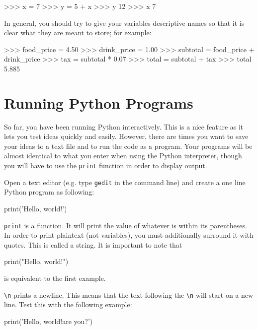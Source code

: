 \documentclass[11pt]{cselabheader}
\begin{document}
\begin{python3code}
>>> x = 7
>>> y = 5 + x
>>> y
12
>>> x
7
\end{python3code}

In general, you should try to give your variables descriptive names so that it is
clear what they are meant to store; for example:

\begin{python3code}
>>> food_price = 4.50
>>> drink_price = 1.00
>>> subtotal = food_price + drink_price
>>> tax = subtotal * 0.07
>>> total = subtotal + tax
>>> total
5.885
\end{python3code}

\pagebreak
\section{Running Python Programs}

So far, you have been running Python interactively. This is a nice feature as it
lets you test ideas quickly and easily. However, there are times you want to
save your ideas to a text file and to run the code as a program. Your programs
will be almost identical to what you enter when using the Python interpreter,
though you will have to use the \texttt{print} function in order to display
output.

Open a text editor (e.g. type \texttt{gedit} in the command line) and create a
one line Python program as following:

\begin{python3code}
print('Hello, world!')
\end{python3code}

\texttt{print} is a function. It will print the value of whatever is within its
parentheses. In order to print plaintext (not variables), you must additionally
surround it with quotes. This is called a string. It is important to note that

\begin{python3code}
print("Hello, world!")
\end{python3code}

is equivalent to the first example.

\texttt{\textbackslash n} prints a newline. This means that the text following
the \texttt{\textbackslash n} will start on a new line. Test this with the
following example:

\begin{python3code}
print('Hello, world!\nHow are you?')
\end{python3code}
\end{document}
